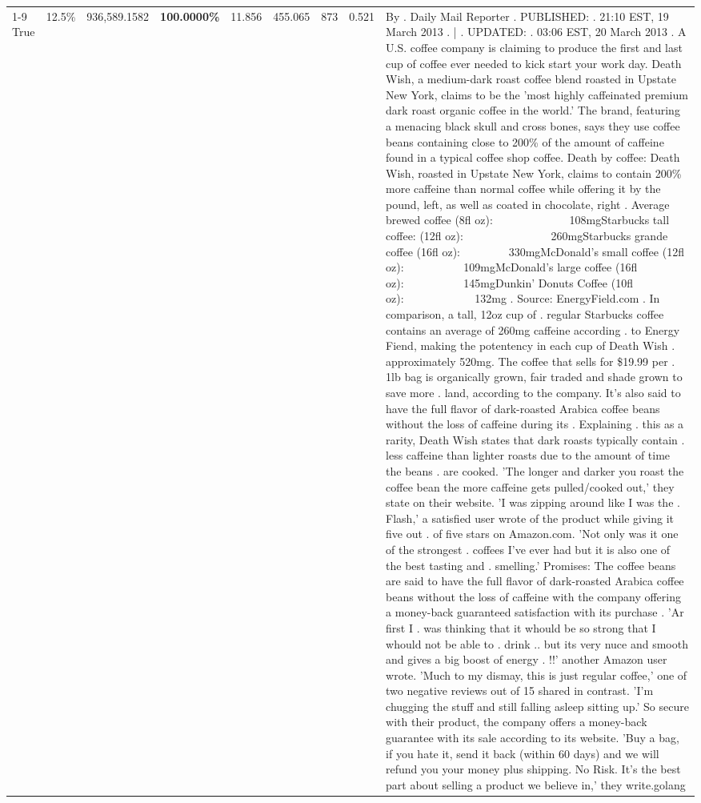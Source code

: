 \begin{table}[H]
{\begin{tabular}{lllrlllll}
\cline{1-9}
True & 12.5\% & 936,589.1582 & \bfseries \color{red} 100.0000\% & 11.856 & 455.065 & 873 & 0.521 & By . Daily Mail Reporter . PUBLISHED: . 21:10 EST, 19 March 2013 . | . UPDATED: . 03:06 EST, 20 March 2013 . A U.S. coffee company is claiming to produce the first and last cup of coffee ever needed to kick start your work day. Death Wish, a medium-dark roast coffee blend roasted in Upstate New York, claims to be the 'most highly caffeinated premium dark roast organic coffee in the world.' The brand, featuring a menacing black skull and cross bones, says they use coffee beans containing close to 200\% of the amount of caffeine found in a typical coffee shop coffee. Death by coffee: Death Wish, roasted in Upstate New York, claims to contain 200\% more caffeine than normal coffee while offering it by the pound, left, as well as coated in chocolate, right . Average brewed coffee (8fl oz):              108mgStarbucks tall coffee: (12fl oz):                260mgStarbucks grande coffee (16fl oz):         330mgMcDonald's small coffee (12fl oz):           109mgMcDonald's large coffee (16fl oz):           145mgDunkin' Donuts Coffee (10fl oz):             132mg . Source: EnergyField.com . In comparison, a tall, 12oz cup of . regular Starbucks coffee contains an average of 260mg caffeine according . to Energy Fiend, making the potentency in each cup of Death Wish . approximately 520mg. The coffee that sells for \$19.99 per . 1lb bag is organically grown, fair traded and shade grown to save more . land, according to the company. It's also said to have the full flavor of dark-roasted Arabica coffee beans without the loss of caffeine during its . Explaining . this as a rarity, Death Wish states that dark roasts typically contain . less caffeine than lighter roasts due to the amount of time the beans . are cooked. 'The longer and darker you roast the coffee bean the more caffeine gets pulled/cooked out,' they state on their website. 'I was zipping around like I was the . Flash,' a satisfied user wrote of the product while giving it five out . of five stars on Amazon.com. 'Not only was it one of the strongest . coffees I've ever had but it is also one of the best tasting and . smelling.’ Promises: The coffee beans are said to have the full flavor of dark-roasted Arabica coffee beans without the loss of caffeine with the company offering a money-back guaranteed satisfaction with its purchase . 'Ar first I . was thinking that it whould be so strong that I whould not be able to . drink .. but its very nuce and smooth and gives a big boost of energy . !!' another Amazon user wrote. 'Much to my dismay, this is just regular coffee,' one of two negative reviews out of 15 shared in contrast. 'I'm chugging the stuff and still falling asleep sitting up.' So secure with their product, the company offers a money-back guarantee with its sale according to its website. 'Buy a bag, if you hate it, send it back (within 60 days) and we will refund you your money plus shipping. No Risk. It’s the best part about selling a product we believe in,' they write.golang \\

\end{tabular}}
\end{table}
